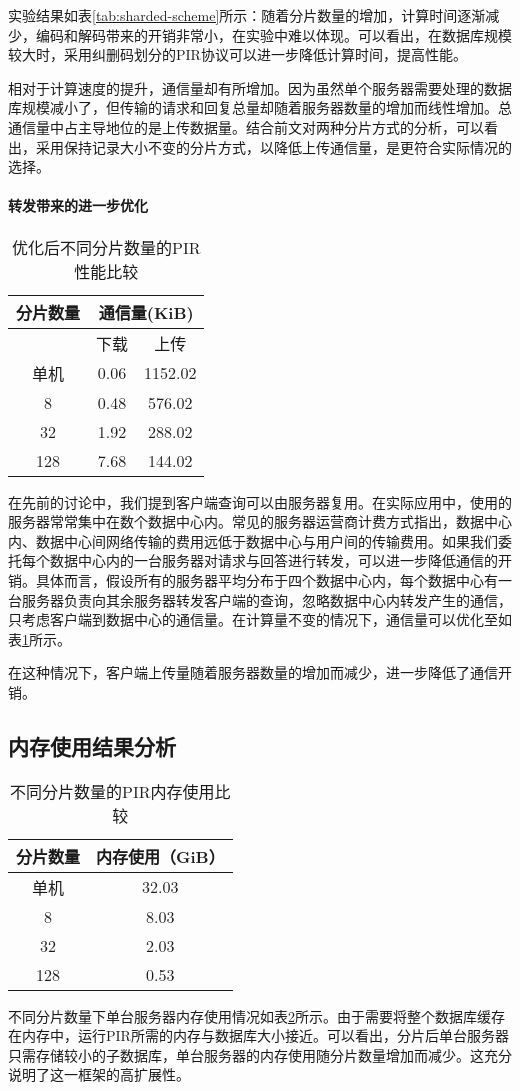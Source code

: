 实验结果如表\ref{tab:sharded-scheme}所示：随着分片数量的增加，计算时间逐渐减少，编码和解码带来的开销非常小，在实验中难以体现。可以看出，在数据库规模较大时，采用纠删码划分的PIR协议可以进一步降低计算时间，提高性能。

相对于计算速度的提升，通信量却有所增加。因为虽然单个服务器需要处理的数据库规模减小了，但传输的请求和回复总量却随着服务器数量的增加而线性增加。总通信量中占主导地位的是上传数据量。结合前文对两种分片方式的分析，可以看出，采用保持记录大小不变的分片方式，以降低上传通信量，是更符合实际情况的选择。

\paragraph{转发带来的进一步优化}
\begin{table}[]
    \caption{优化后不同分片数量的PIR性能比较}
    \label{tab:sharded-scheme-optimized}
    \centering
    \begin{tabular}{@{}c|cc@{}}
    \toprule
    分片数量 & \multicolumn{2}{c}{通信量(KiB)} \\ \midrule
         & 下载      & 上传       \\ \midrule
    单机   & 0.06          & 1152.02      \\
    8    & 0.48          & 576.02       \\
    32   & 1.92          & 288.02       \\
    128  & 7.68          & 144.02       \\ \bottomrule
    \end{tabular}
\end{table}
在先前的讨论中，我们提到客户端查询可以由服务器复用。在实际应用中，使用的服务器常常集中在数个数据中心内。常见的服务器运营商计费方式\cite{gcp}指出，数据中心内、数据中心间网络传输的费用远低于数据中心与用户间的传输费用。如果我们委托每个数据中心内的一台服务器对请求与回答进行转发，可以进一步降低通信的开销。具体而言，假设所有的服务器平均分布于四个数据中心内，每个数据中心有一台服务器负责向其余服务器转发客户端的查询，忽略数据中心内转发产生的通信，只考虑客户端到数据中心的通信量。在计算量不变的情况下，通信量可以优化至如表\ref{tab:sharded-scheme-optimized}所示。

在这种情况下，客户端上传量随着服务器数量的增加而减少，进一步降低了通信开销。

\subsection{内存使用结果分析}
\begin{table}[]
    \centering
    \caption{不同分片数量的PIR内存使用比较}
    \label{sharded-scheme-memory}
    \begin{tabular}{c|c}
    \hline
    分片数量 & 内存使用（GiB） \\ \hline
    单机   & 32.03     \\
    8    & 8.03      \\
    32   & 2.03      \\
    128  & 0.53      \\ \hline
    \end{tabular}
\end{table}

不同分片数量下单台服务器内存使用情况如表\ref{sharded-scheme-memory}所示。由于需要将整个数据库缓存在内存中，运行PIR所需的内存与数据库大小接近。可以看出，分片后单台服务器只需存储较小的子数据库，单台服务器的内存使用随分片数量增加而减少。这充分说明了这一框架的高扩展性。